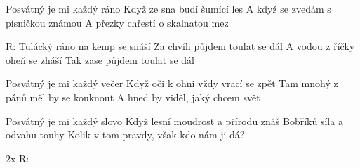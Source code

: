 \resetVars
{}
\MakeHeader
\Lyrics

Posvátný je mi každý ráno
Když ze sna budí šumící les
A když se zvedám s písničkou známou
A přezky chřestí o skalnatou mez

R:  Tulácký ráno na kemp se snáší
 Za chvíli půjdem toulat se dál
A vodou z říčky oheň se zháší
Tak zase půjdem toulat se dál

Posvátný je mi každý večer
Když oči k ohni vždy vrací se zpět
Tam mnohý z pánů měl by se kouknout
A hned by viděl, jaký chcem svět

Posvátný je mi každý slovo
Když lesní moudrost a přírodu znáš
Bobříků síla a odvahu touhy
Kolik v tom pravdy, však kdo nám ji dá?

2x R:

\Next
